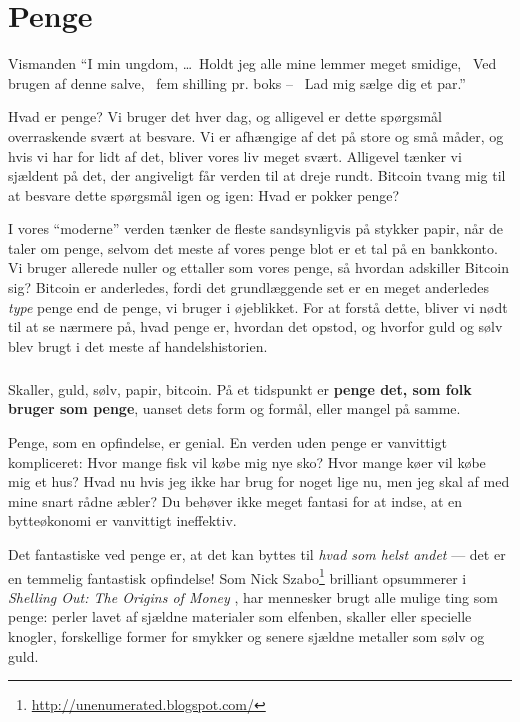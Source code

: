 \chapter{Penge}
\label{les:11}

\begin{chapquote}{Vismanden}
\enquote{I min ungdom, \ldots \
Holdt jeg alle mine lemmer meget smidige, \
Ved brugen af denne salve, \
fem shilling pr. boks -- \
Lad mig sælge dig et par.}
\end{chapquote}

Hvad er penge? Vi bruger det hver dag, og alligevel er dette spørgsmål overraskende svært at besvare.
Vi er afhængige af det på store og små måder, og hvis vi har for lidt af det, bliver vores liv meget 
svært. Alligevel tænker vi sjældent på det, der angiveligt får verden til at dreje rundt. Bitcoin tvang mig til at besvare dette spørgsmål igen og igen: Hvad er pokker penge?

I vores \enquote{moderne} verden tænker de fleste sandsynligvis på stykker papir, når de taler om penge, selvom det meste af vores penge blot er et tal på en bankkonto. Vi bruger allerede nuller og ettaller som vores penge, så hvordan adskiller Bitcoin sig? Bitcoin er anderledes, fordi det grundlæggende set er en meget anderledes \textit{type} penge end de penge, vi bruger i øjeblikket. For at forstå dette, bliver vi nødt til at se nærmere på, hvad penge er, hvordan det opstod, og hvorfor guld og sølv blev brugt i det meste af handelshistorien.

\paragraph{}
Skaller, guld, sølv, papir, bitcoin. På et tidspunkt er \textbf{penge det, som folk bruger som penge}, uanset dets form og formål, eller mangel på samme.

Penge, som en opfindelse, er genial. En verden uden penge er vanvittigt kompliceret: Hvor mange fisk vil købe mig nye sko? Hvor mange køer vil købe mig et hus? Hvad nu hvis jeg ikke har brug for noget lige nu, men jeg skal af med mine snart rådne æbler? Du behøver ikke meget fantasi for at indse, at en bytteøkonomi er vanvittigt ineffektiv.

Det fantastiske ved penge er, at det kan byttes til \textit{hvad som helst andet} --- det er en temmelig fantastisk opfindelse! Som Nick Szabo\footnote{\url{http://unenumerated.blogspot.com/}} brilliant opsummerer i \textit{Shelling Out: The Origins of Money} \cite{shelling-out}, har mennesker brugt alle mulige ting som penge: perler lavet af sjældne materialer som elfenben, skaller eller specielle knogler, forskellige former for smykker og senere sjældne metaller som sølv og guld.

